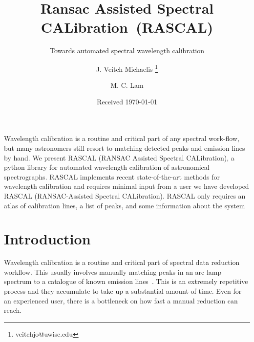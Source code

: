 \documentclass{aa}
\begin{document}
 

   \title{Ransac Assisted Spectral CALibration~(RASCAL)}

   \subtitle{Towards automated spectral wavelength calibration}

   \author{J. Veitch-Michaelis
          \fnmsep\thanks{veitchjo@uwisc.edu}
          \and
          M. C. Lam
          }


   \date{Received \today}

 
  \abstract
   {Wavelength calibration is a routine and critical part of any spectral work-flow, but many astronomers still resort to matching detected peaks and emission lines by hand.}
   {We present RASCAL (RANSAC Assisted Spectral CALibration), a python library for automated wavelength calibration of astronomical spectrographs. RASCAL implements recent state-of-the-art methods for wavelength calibration and requires minimal input from a user}
   {}
   {we have developed RASCAL (RANSAC-Assisted Spectral CALibration). RASCAL only requires an atlas of calibration lines, a list of peaks,
and some information about the system}
   {}


   \maketitle
%
\section{Introduction}
Wavelength calibration is a routine and critical part of spectral data reduction
workflow. This usually involves manually matching peaks in an arc lamp spectrum to a
catalogue of known emission lines~\citep{2010MNRAS.409.1601B}. This is an extremely
repetitive process and they accumulate to take up a substantial amount of time.
Even for an experienced user, there is a bottleneck on how fast a manual reduction
can reach.
\end{document}
